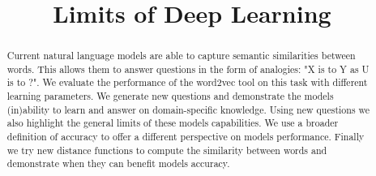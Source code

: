 \documentclass[conference]{IEEEtran}
\begin{document}
%
\title{Limits of Deep Learning}


\author{
\and
{}
}


\maketitle

\begin{abstract}
Current natural language models are able to capture semantic similarities between words.
This allows them to answer questions in the form of analogies: "X is to Y as U is to ?".
We evaluate the performance of the word2vec tool on this task with different learning parameters.
We generate new questions and demonstrate the models (in)ability to learn and answer on domain-specific knowledge. Using new questions we also highlight the general limits of these models capabilities.
We use a broader definition of accuracy to offer a different perspective on models performance.
Finally we try new distance functions to compute the similarity between words and demonstrate when they can benefit models accuracy.


\end{abstract}



%
\IEEEpeerreviewmaketitle
\end{document}
